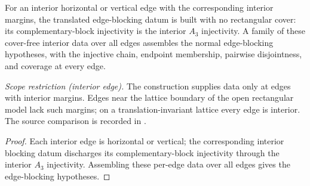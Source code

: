 \begin{lemma}%
    \label{lem:peps_normalSquareInteriorEdgeBlocking}
    \leanok
    For an interior horizontal or vertical edge with the corresponding interior
    margins, the translated edge-blocking datum is built with no rectangular
    cover: its complementary-block injectivity is the interior $A_3$
    injectivity. A family of these cover-free interior data over all edges
    assembles the normal edge-blocking hypotheses, with the injective chain,
    endpoint membership, pairwise disjointness, and coverage at every edge.

    \emph{Scope restriction (interior edge).} The construction supplies data
    only at edges with interior margins. Edges near the lattice boundary of the
    open rectangular model lack such margins; on a translation-invariant lattice
    every edge is interior. The source comparison is recorded in
    .
\end{lemma}
\begin{proof}\leanok
    Each interior edge is horizontal or vertical; the corresponding interior
    blocking datum discharges its complementary-block injectivity through the
    interior $A_3$ injectivity. Assembling these per-edge data over all edges
    gives the edge-blocking hypotheses.
\end{proof}

